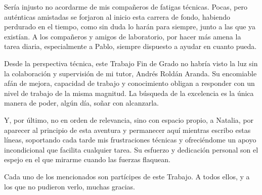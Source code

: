 Sería injusto no acordarme de mis compañeros de fatigas técnicas. Pocas, pero auténticas amistadas se forjaron al inicio esta carrera de fondo, habiendo perdurado en el tiempo, como sin duda lo harán para siempre, junto a las que ya existían. A los compañeros y amigos de laboratorio, por hacer más amena la tarea diaria, especialmente a Pablo, siempre dispuesto a ayudar en cuanto pueda.

Desde la perspectiva técnica, este Trabajo Fin de Grado no habría visto la luz sin la colaboración y supervisión de mi tutor, Andrés Roldán Aranda. Su encomiable afán de mejora, capacidad de trabajo y conocimiento obligan a responder con un nivel de trabajo de la misma magnitud. La búsqueda de la excelencia es la única manera de poder, algún día, soñar con alcanzarla.

Y, por último, no en orden de relevancia, sino con espacio propio, a Natalia, por aparecer al principio de esta aventura y permanecer aquí mientras escribo estas líneas, soportando cada tarde mis frustraciones técnicas y ofreciéndome un apoyo incondicional que facilita cualquier tarea. Su esfuerzo y dedicación personal son el espejo en el que mirarme cuando las fuerzas flaquean.

Cada uno de los mencionados son partícipes de este Trabajo. A todos ellos, y a los que no pudieron verlo, muchas gracias.
\clearpage




\newpage
\thispagestyle{empty}
~
\newpage
\thispagestyle{empty}


